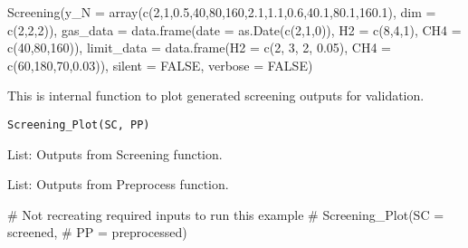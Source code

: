\documentclass[a4paper]{book}
\begin{document}
%
\begin{Examples}
\begin{ExampleCode}
Screening(y_N = array(c(2,1,0.5,40,80,160,2.1,1.1,0.6,40.1,80.1,160.1), dim = c(2,2,2)),
          gas_data = data.frame(date = as.Date(c(2,1,0)), H2 = c(8,4,1), CH4 = c(40,80,160)),
          limit_data = data.frame(H2 = c(2, 3, 2, 0.05), CH4 = c(60,180,70,0.03)),
          silent = FALSE, verbose = FALSE)
\end{ExampleCode}
\end{Examples}
%
\begin{Description}
This is internal function to plot generated screening outputs for validation.
\end{Description}
%
\begin{Usage}
\begin{verbatim}
Screening_Plot(SC, PP)
\end{verbatim}
\end{Usage}
%
\begin{Arguments}
\begin{ldescription}
\item[\code{SC}] List: Outputs from Screening function.

\item[\code{PP}] List: Outputs from Preprocess function.
\end{ldescription}
\end{Arguments}
%
\begin{Examples}
\begin{ExampleCode}
# Not recreating required inputs to run this example
# Screening_Plot(SC = screened,
#                PP = preprocessed)
\end{ExampleCode}
\end{Examples}
\printindex{}
\end{document}

